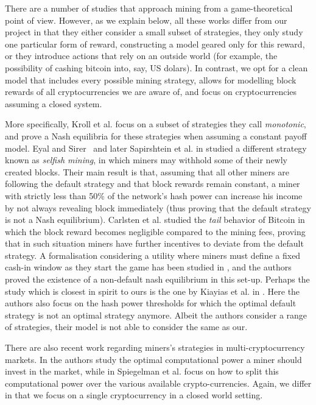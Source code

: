 There are a number of studies that approach mining from a game-theoretical point of view. However, as we explain below, all these works 
differ from our project in that they either consider a small subset of strategies, they only study one particular form of reward, constructing a model geared only for this reward, 
or they introduce actions that rely on an outside world (for example, the possibility of cashing bitcoin into, say, US dolars). In contrast, we opt for a clean model that includes every possible mining strategy, allows for modelling block rewards of all cryptocurrencies we are aware of, and focus on cryptocurrencies assuming a closed system. 

More specifically,  Kroll et al. \cite{economics_of_mining2013} focus on a subset of strategies they call \emph{monotonic}, and prove a 
Nash equilibria for these strategies when assuming a constant payoff model. Eyal and Sirer~\cite{selfishmining2014}  and later Sapirshtein et al. in \cite{optimalselfishmining2017} studied a different strategy known as \emph{selfish mining}, in which miners may withhold some of their newly created blocks. Their main result is that, assuming that all other miners are following the default strategy and that block rewards remain constant, a miner with strictly less than 50\% of the network's hash power can increase his income by not always revealing block immediately (thus proving that the default strategy is not a Nash equilibrium). Carlsten et al. \cite{instabilitywithoutreward:2016} studied the \emph{tail} behavior of Bitcoin in which the block reward becomes negligible compared to the mining fees, proving that in such situation miners have further incentives to deviate from the default strategy. 
A formalisation considering a utility where miners must define a fixed cash-in window as they start the game has been studied in \cite{biais2018blockchain}, and the authors proved the existence of a non-default nash equilibrium in this set-up.
Perhaps the study which is closest in spirit to ours is the one by Kiayias et al. in \cite{mininggames:2016}. %
Here the authors also focus on the hash power thresholds for which the optimal default strategy is not an optimal strategy anymore. Albeit the authors consider a range of strategies, their model is not able to consider the same as our.

There are also recent work regarding miners's strategies in multi-cryptocurrency markets. In \cite{dhamal2018stochastic} the authors study the optimal computational power a miner should invest in the market, while in \cite{spiegelman2018game} Spiegelman et al. focus on how to split this computational power over the various available crypto-currencies. Again, we differ in that we focus on a single cryptocurrency in a closed world setting.
